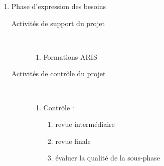 \begin{enumerate}
\begin{description}
    \end{description}

    \item Phase d'expression des besoins
    \begin{description}

      \item[Activités de support du projet] \hfill \\
          \begin{enumerate}
            \item Formations ARIS
          \end{enumerate}

      \item[Activités de contrôle du projet] \hfill \\
          \begin{enumerate}
            \item Contrôle :
                \begin{enumerate}
                  \item revue intermédiaire 
                  \item revue finale 
                  \item évaluer la qualité de la sous-phase 
                \end{enumerate}
          \end{enumerate}


\end{description}
\end{enumerate}
